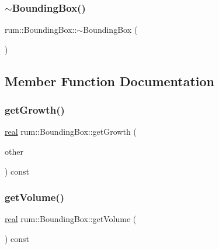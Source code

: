 \mbox{\label{classrum_1_1_bounding_box_a515a617dd779ad1932598f0bb6bd9669}} 
\subsubsection{\texorpdfstring{$\sim$\+Bounding\+Box()}{~BoundingBox()}}
{\footnotesize\ttfamily rum\+::\+Bounding\+Box\+::$\sim$\+Bounding\+Box (\begin{DoxyParamCaption}{ }\end{DoxyParamCaption})}



\subsection{Member Function Documentation}
\mbox{\label{classrum_1_1_bounding_box_a17b3182994f8b113be3aee8063563ea9}} 
\subsubsection{\texorpdfstring{get\+Growth()}{getGrowth()}}
{\footnotesize\ttfamily \mbox{\hyperlink{namespacerum_a7e8cca23573d5eaead0f138cbaa4862c}{real}} rum\+::\+Bounding\+Box\+::get\+Growth (\begin{DoxyParamCaption}\item[{const \mbox{\hyperlink{classrum_1_1_bounding_box}{Bounding\+Box}} \&}]{other }\end{DoxyParamCaption}) const}

\mbox{\label{classrum_1_1_bounding_box_a4a41c20aaf5e75fa695b92ab2a7c178b}} 
\subsubsection{\texorpdfstring{get\+Volume()}{getVolume()}}
{\footnotesize\ttfamily \mbox{\hyperlink{namespacerum_a7e8cca23573d5eaead0f138cbaa4862c}{real}} rum\+::\+Bounding\+Box\+::get\+Volume (\begin{DoxyParamCaption}{ }\end{DoxyParamCaption}) const}

